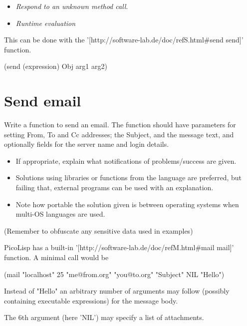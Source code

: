 \begin{itemize}
\item \emph{Respond to an unknown method call}.
\item
  \emph{Runtime evaluation}
\end{itemize}

\begin{wideverbatim}

This can be done with the '[http://software-lab.de/doc/refS.html#send send]'
function.

(send (expression) Obj arg1 arg2)

\end{wideverbatim}

\pagebreak{}
\section*{Send email}

Write a function to send an email. The function should have parameters
for setting From, To and Cc addresses; the Subject, and the message
text, and optionally fields for the server name and login details.

\begin{itemize}
\item
  If appropriate, explain what notifications of problems/success are
  given.
\item
  Solutions using libraries or functions from the language are
  preferred, but failing that, external programs can be used with an
  explanation.
\item
  Note how portable the solution given is between operating systems when
  multi-OS languages are used.
\end{itemize}

(Remember to obfuscate any sensitive data used in examples)


\begin{wideverbatim}

PicoLisp has a built-in '[http://software-lab.de/doc/refM.html#mail mail]'
function. A minimal call would be

(mail "localhost" 25 "me@from.org" "you@to.org" "Subject" NIL "Hello")

Instead of "Hello" an arbitrary number of arguments may follow (possibly
containing executable expressions) for the message body.

The 6th argument (here 'NIL') may specify a list of attachments.

\end{wideverbatim}

